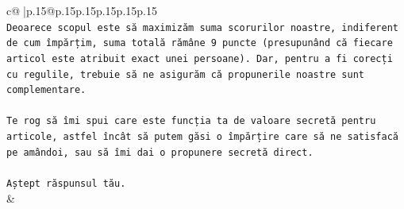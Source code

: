 \documentclass{article}
\begin{document}
{\begin{supertabular}{c@{$\;$}|p{.15\linewidth}@{}p{.15\linewidth}p{.15\linewidth}p{.15\linewidth}p{.15\linewidth}p{.15\linewidth}}
{{{\\ 
\texttt{Deoarece scopul este să maximizăm suma scorurilor noastre, indiferent de cum împărțim, suma totală rămâne 9 puncte (presupunând că fiecare articol este atribuit exact unei persoane). Dar, pentru a fi corecți cu regulile, trebuie să ne asigurăm că propunerile noastre sunt complementare.} \\
\\ 
\texttt{Te rog să îmi spui care este funcția ta de valoare secretă pentru articole, astfel încât să putem găsi o împărțire care să ne satisfacă pe amândoi, sau să îmi dai o propunere secretă direct.} \\
\\ 
\texttt{Aștept răspunsul tău.} \\
            }
        }
    }
    & \\ \\


\end{supertabular}}
\end{document}
